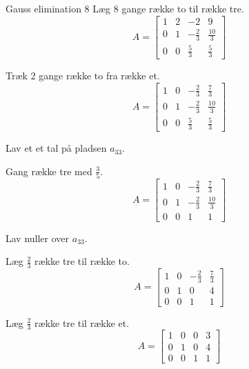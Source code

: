 \documentclass{article}
\begin{document}
\begin{exercise}{Gauss elimination 8}
\hint
Læg 8 gange række to til række tre.
\[
A = \left[\begin{array}{rrr|r}
1 & 2 & -2 & 9 \\
0 & 1 & - \frac{2}{3} & \frac{10}{3} \\
0 & 0 & \frac{5}{3} & \frac{5}{3}
\end{array} \right]
\]

\hint
Træk 2 gange række to fra række et.
\[
A = \left[\begin{array}{rrr|r}
1 & 0 & - \frac{2}{3} & \frac{7}{3} \\
0 & 1 & - \frac{2}{3} & \frac{10}{3} \\
0 & 0 & \frac{5}{3} & \frac{5}{3}
\end{array} \right]
\]

\hint
Lav et et tal på pladsen $a_{33}$.

\hint
Gang række tre med $\frac{3}{5}$.
\[
A = \left[\begin{array}{rrr|r}
1 & 0 & - \frac{2}{3} & \frac{7}{3} \\
0 & 1 & - \frac{2}{3} & \frac{10}{3} \\
0 & 0 & 1 & 1
\end{array} \right]
\]

\hint
Lav nuller over $a_{33}$.

\hint
Læg $\frac{2}{3}$ række tre til række to.
\[
A = \left[\begin{array}{rrr|r}
1 & 0 & - \frac{2}{3} & \frac{7}{3} \\
0 & 1 & 0 & 4 \\
0 & 0 & 1 & 1
\end{array} \right]
\]

\hint
Læg $\frac{2}{3}$ række tre til række et.
\[
A = \left[\begin{array}{rrr|r}
1 & 0 & 0 & 3 \\
0 & 1 & 0 & 4\\
0 & 0 & 1 & 1
\end{array} \right]
\]


\end{exercise}
\end{document}
